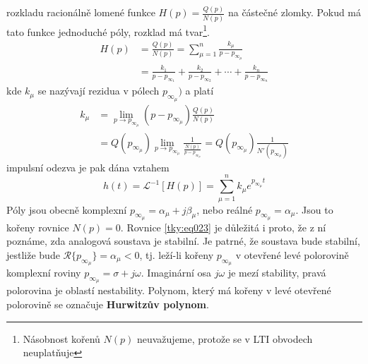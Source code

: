       rozkladu racionálně lomené funkce $H(p)=\frac{Q(p)}{N(p)}$ na částečné zlomky. Pokud má tato 
      funkce jednoduché póly, rozklad má tvar\footnote{Násobnost kořenů $N(p)$ neuvažujeme, protože 
      se v LTI obvodech neuplatňuje}.
      \begin{align}
         H(p)&=\frac{Q(p)}{N(p)} 
              =\sum_{\mu=1}^{n}\frac{k_\mu}{p-p_{\infty_\mu}}                  \nonumber \\
             &=\frac{k_1}{p-p_{\infty_1}}+\frac{k_2}{p-p_{\infty_2}}
               +\cdots+\frac{k_n}{p-p_{\infty_n}}                              \label{tky:eq004}
      \end{align}
      kde $k_\mu$ se nazývají rezidua v pólech $p_{\infty_\mu})$ a platí
      \begin{align}
        k_\mu &= \lim_{p\to p_{\infty_\mu}}(p-p_{\infty_\mu})\frac{Q(p)}{N(p)}  \nonumber \\
        \,    &= Q(p_{\infty_\mu})\lim_{p\to
                 p_{\infty_\mu}}\frac{1}{\frac{N(p)}{p-p_{\infty_\mu}}}=
                 Q(p_{\infty_\mu})\frac{1}{N'(p_{\infty_\mu})}                  \label{tky:eq006}
      \end{align}
      impulsní odezva je pak dána vztahem
      \begin{equation}\label{tky:eq023}
        h(t)=\mathcal{L}^{-1}[H(p)]=\sum_{\mu=1}^nk_\mu e^{p_{\infty_\mu}t}
      \end{equation}
      Póly jsou obecně komplexní $p_{\infty_{\mu}}=\alpha_\mu+j\beta_\mu$, nebo reálné
      $p_{\infty_{\mu}}=\alpha_\mu$. Jsou to kořeny rovnice $N(p)=0$. Rovnice \ref{tky:eq023} je
      důležitá i proto, že z ní poznáme, zda analogová soustava je stabilní. Je patrné, že soustava
      bude stabilní, jestliže bude $\mathcal{R}\{p_{\infty_{\mu}}\}=\alpha_\mu<0$, tj. leží-li
      kořeny $p_{\infty_{\mu}}$ v otevřené levé polorovině komplexní roviny
      $p_{\infty_{\mu}}=\sigma+j\omega$. Imaginární osa $j\omega$ je mezí stability, pravá
      polorovina je oblastí nestability. Polynom, který má kořeny v levé otevřené polorovině se
      označuje \textbf{Hurwitzův polynom}.
      
